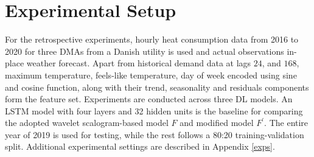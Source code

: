 \section{Experimental Setup} \label{exp}

For the retrospective experiments, hourly heat consumption data from 2016 to 2020 for three DMAs from a Danish utility is used and actual observations in-place weather forecast. Apart from historical demand data at lags $24$, and $168$, maximum temperature, feels-like temperature, day of week encoded using sine and cosine function, along with their trend, seasonality and residuals components form the feature set. Experiments are conducted across three DL models. An LSTM model with four layers and 32 hidden units is the baseline for comparing the adopted wavelet scalogram-based model $F$ and modified model $F^{'}$. The entire year of 2019 is used for testing, while the rest follows a 80:20 training-validation split. Additional experimental settings are described in Appendix \ref{exps}.



